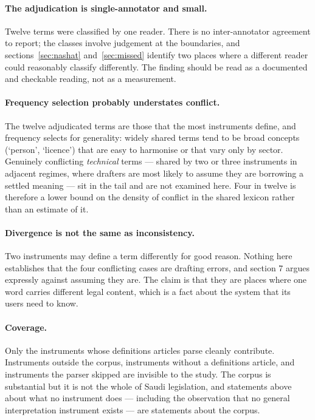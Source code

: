 \documentclass[11pt]{article}
\begin{document}
\paragraph{The adjudication is single-annotator and small.} Twelve terms were
classified by one reader. There is no inter-annotator agreement to report;
the classes involve judgement at the boundaries, and
sections~\ref{sec:nashat} and~\ref{sec:missed} identify two places where a different reader could reasonably classify
differently. The finding should be read as a documented and checkable
reading, not as a measurement.

\paragraph{Frequency selection probably understates conflict.} The twelve
adjudicated terms are those that the most instruments define, and frequency
selects for generality: widely shared terms tend to be broad concepts
(`person', `licence') that are easy to harmonise or that vary only by sector.
Genuinely conflicting \emph{technical} terms --- shared by two or three
instruments in adjacent regimes, where drafters are most likely to assume
they are borrowing a settled meaning --- sit in the tail and are not examined
here. Four in twelve is therefore a lower bound on the density of conflict in
the shared lexicon rather than an estimate of it.

\paragraph{Divergence is not the same as inconsistency.} Two instruments may
define a term differently for good reason. Nothing here establishes that the
four conflicting cases are drafting errors, and section 7 argues expressly
against assuming they are. The claim is that they are places where one word
carries different legal content, which is a fact about the system that its
users need to know.

\paragraph{Coverage.} Only the \nWithDefsArticle{} instruments whose definitions articles
parse cleanly contribute. Instruments outside the corpus, instruments without
a definitions article, and instruments the parser skipped are invisible to
the study. The corpus is substantial but it is not the whole of Saudi
legislation, and statements above about what no instrument does --- including
the observation that no general interpretation instrument exists --- are
statements about the corpus.
\end{document}
